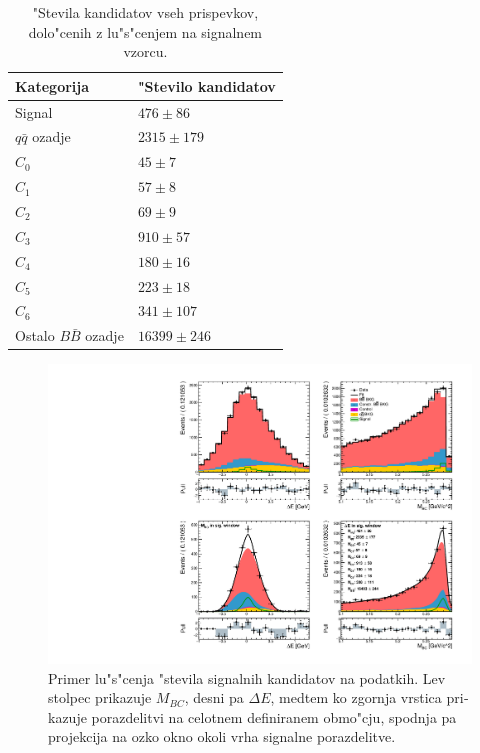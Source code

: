 \begin{otherlanguage}{slovene}
\begin{table}[H]
	\centering
	\begin{tabular}{l|l}
		Kategorija & "Stevilo kandidatov \\
		\toprule
		Signal & $476 \pm 86$ \\
		$q \bar q$ ozadje & $ 2315 \pm 179 $ \\
		$C_0$ & $ 45 \pm 7 $ \\
		$C_1$ & $ 57 \pm 8 $\\
		$C_2$ & $ 69 \pm 9 $ \\
		$C_3$ & $ 910 \pm 57 $ \\
		$C_4$ & $ 180 \pm 16 $ \\
		$C_5$ & $ 223 \pm 18 $ \\
		$C_6$ & $ 341 \pm 107 $ \\
		Ostalo $B \bar B$ ozadje & $ 16399 \pm 246 $ \\
		\bottomrule
	\end{tabular}
	\captionsetup{width=.8\linewidth}
	\caption{"Stevila kandidatov vseh prispevkov, dolo"cenih z lu"s"cenjem na signalnem vzorcu.}
	\label{tab:sig_yields_si}
\end{table}

\begin{figure}[H]
	\centering
	\captionsetup{width=0.8\linewidth}
	\includegraphics[width=\linewidth]{fig/sig_fit_data}
	\caption{Primer lu"s"cenja "stevila signalnih kandidatov na podatkih. Lev stolpec prikazuje $M_{BC}$, desni pa $\Delta E$, medtem ko zgornja vrstica prikazuje porazdelitvi na celotnem definiranem obmo"cju, spodnja pa projekcija na ozko okno okoli vrha signalne porazdelitve.}
	\label{fig:sig_datafit_si}
\end{figure}


\end{otherlanguage}

